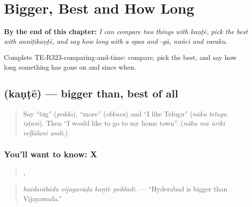 
\chapter{Bigger, Best and How Long}
\label{ch:te-bigger-best-and-how-long}

\begin{chapteropening}
\textbf{By the end of this chapter:} \emph{I can compare two things with kaṇṭē, pick the best with anniṭikaṇṭē, and say how long with a span and -gā, nuñci and varaku.}

Complete TE-R323-comparing-and-time: compare, pick the best, and say how long something has gone on and since when.
\end{chapteropening}

\section[\texorpdfstring{\te{కంటే} (kaṇṭē)}{కంటే (kaṇṭē)}]{ (kaṇṭē) — bigger than, best of all}

\label{lesson:TE-C323-kante}



\begin{quote}
Say \textquotedblleft{}big\textquotedblright{} (\emph{pedda}), \textquotedblleft{}more\textquotedblright{} (\emph{ekkuva}) and \textquotedblleft{}I like Telugu\textquotedblright{} (\emph{nāku telugu iṣṭaṁ}). Then \textquotedblleft{}I would like to go to my home town\textquotedblright{}. (\emph{nāku mā ūriki veḷḷālani undi}.)
\end{quote}

\subsection*{You'll want to know: X }
\begin{quote}
\textbf{   .}
\end{quote}

\begin{quote}
\emph{haidarābādu vijayavāḍa kaṇṭē peddadi.} — \textquotedblleft{}Hyderabad is bigger than Vijayawada.\textquotedblright{}
\end{quote}

